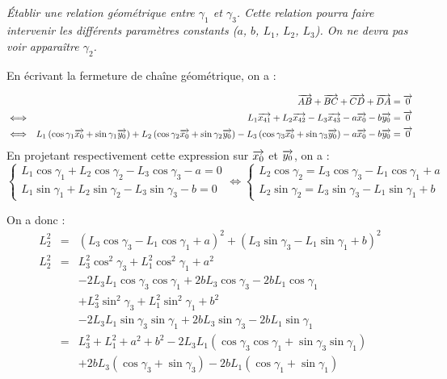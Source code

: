 \documentclass[10pt,fleqn]{article} %
\begin{document}
\begin{multicols}{2}
\subparagraph{}
\textit{Établir une relation géométrique entre $\gamma_1$ et $\gamma_3$. Cette relation pourra faire intervenir les différents paramètres constants ($a$, $b$, $L_1$, $L_2$, $L_3$). On ne devra pas voir apparaître $\gamma_2$.}

\ifprof
\begin{corrige}
En écrivant la fermeture de chaîne géométrique, on a : 

\begin{eqnarray*}
&& \overrightarrow{AB}+\overrightarrow{BC}+\overrightarrow{CD} + \overrightarrow{DA} = \overrightarrow{0} \\
& \Longleftrightarrow& L_1\overrightarrow{x_{41}} + L_2\overrightarrow{x_{42}} - L_3\overrightarrow{x_{43}}
- a\overrightarrow{x_{0}}-b\overrightarrow{y_{0}} = \overrightarrow{0}\\
& \Longleftrightarrow&  
L_1\left(\cos\gamma_{1}\overrightarrow{x_0}+ \sin\gamma_{1}\overrightarrow{y_0}\right) + L_2\left(\cos\gamma_{2}\overrightarrow{x_0}+ \sin\gamma_{2}\overrightarrow{y_0}\right)
-L_3\left(\cos\gamma_{3}\overrightarrow{x_0}+ \sin\gamma_{3}\overrightarrow{y_0}\right)
- a\overrightarrow{x_{0}}-b\overrightarrow{y_{0}} = \overrightarrow{0}\\
\end{eqnarray*}
En projetant respectivement cette expression sur $\overrightarrow{x_0}$ et $\overrightarrow{y_0}$, on a : 
$$
\left\{
\begin{array}{l}
L_1 \cos\gamma_{1} + L_2 \cos\gamma_{2} 
-L_3\cos\gamma_{3} - a= 0\\
L_1 \sin\gamma_{1} + L_2 \sin\gamma_{2}
-L_3 \sin\gamma_{3} -b=0
\end{array}
\right.
\Longleftrightarrow
\left\{
\begin{array}{l}
L_2 \cos\gamma_{2} =L_3\cos\gamma_{3}- L_1 \cos\gamma_{1} + a  \\
L_2 \sin\gamma_{2} = L_3 \sin\gamma_{3}-L_1 \sin\gamma_{1} + b
\end{array}
\right.
$$

On a donc : 
\begin{eqnarray*}
L_2^2 &=& \left( L_3\cos\gamma_{3}- L_1 \cos\gamma_{1} + a  \right)^2
+ \left( L_3 \sin\gamma_{3}-L_1 \sin\gamma_{1} + b\right)^2 \\
L_2^2 &=& 
L_3^2\cos^2\gamma_{3}+ L_1^2 \cos^2\gamma_{1} + a^2 \\
&&-2  L_3 L_1\cos\gamma_{3} \cos\gamma_{1}
+2 b L_3 \cos\gamma_{3}
-2bL_1 \cos\gamma_{1}\\
&&+L_3^2 \sin^2\gamma_{3}+ L_1^2 \sin^2\gamma_{1} + b^2 \\
&&-2  L_3 L_1 \sin\gamma_{3} \sin\gamma_{1}
+2 b L_3 \sin\gamma_{3}
-2bL_1 \sin\gamma_{1}\\
& = & L_3^2+ L_1^2  + a^2+ b^2  
-2  L_3 L_1\left( \cos\gamma_{3} \cos\gamma_{1} + \sin\gamma_{3} \sin\gamma_{1} \right)\\
&& +2 b L_3 \left( \cos\gamma_{3} + \sin\gamma_{3}\right)
-2bL_1 \left( \cos\gamma_{1} + \sin\gamma_{1}\right)\\
\end{eqnarray*}
\end{corrige}
\else \fi





\ifprof
\else
\end{multicols}
\fi

\end{document}
